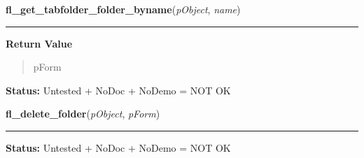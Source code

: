     \label{xformslib:library:fl_get_tabfolder_folder_byname}

    \vspace{0.5ex}

\hspace{.8\funcindent}\begin{boxedminipage}{\funcwidth}

    \raggedright \textbf{fl\_get\_tabfolder\_folder\_byname}(\textit{pObject}, \textit{name})

    \vspace{-1.5ex}

    \rule{\textwidth}{0.5\fboxrule}
\setlength{\parskip}{2ex}
\setlength{\parskip}{1ex}
      \textbf{Return Value}
    \vspace{-1ex}

      \begin{quote}
      pForm

      \end{quote}

\textbf{Status:} Untested + NoDoc + NoDemo = NOT OK



    \end{boxedminipage}

    \label{xformslib:library:fl_delete_folder}

    \vspace{0.5ex}

\hspace{.8\funcindent}\begin{boxedminipage}{\funcwidth}

    \raggedright \textbf{fl\_delete\_folder}(\textit{pObject}, \textit{pForm})

    \vspace{-1.5ex}

    \rule{\textwidth}{0.5\fboxrule}
\setlength{\parskip}{2ex}
\setlength{\parskip}{1ex}
\textbf{Status:} Untested + NoDoc + NoDemo = NOT OK



    \end{boxedminipage}

    \label{xformslib:library:fl_delete_folder_bynumber}


